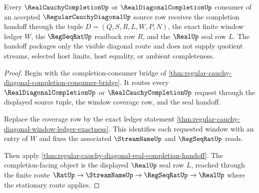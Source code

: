 \begin{theorem}
\label{thm:regular-cauchy-diagonal-real-completion-handoff-package}
Every $\RealCauchyCompletionUp$ or $\RealDiagonalCompletionUp$ consumer of an accepted $\RegularCauchyDiagonalUp$ source row receives the completion handoff through the tuple $D=(Q,S,R,L,W,P,N)$, the exact finite window ledger $W$, the $\RegSeqRatUp$ readback row $R$, and the $\RealUp$ seal row $L$. The handoff packages only the visible diagonal route and does not supply quotient streams, selected host limits, host equality, or ambient completeness.
\end{theorem}
\begin{proof}
Begin with the completion-consumer bridge of \autoref{thm:regular-cauchy-diagonal-completion-consumer-bridge}. It routes every $\RealDiagonalCompletionUp$ or $\RealCauchyCompletionUp$ request through the displayed source tuple, the window coverage row, and the seal handoff.

Replace the coverage row by the exact ledger statement \autoref{thm:regular-cauchy-diagonal-window-ledger-exactness}. This identifies each requested window with an entry of $W$ and fixes the associated $\StreamNameUp$ and $\RegSeqRatUp$ reads.

Then apply \autoref{thm:regular-cauchy-diagonal-real-completion-handoff}. The completion-facing object is the displayed $\RealUp$ seal row $L$, reached through the finite route $\RatUp \to \StreamNameUp \to \RegSeqRatUp \to \RealUp$ where the stationary route applies.
\end{proof}


